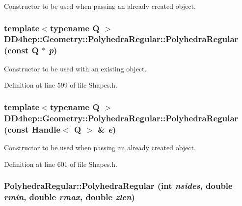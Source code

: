 Constructor to be used when passing an already created object. \hypertarget{class_d_d4hep_1_1_geometry_1_1_polyhedra_regular_afa1b9c6651dddf2914285ea518952483}{
\subsubsection[{PolyhedraRegular}]{\setlength{\rightskip}{0pt plus 5cm}template$<$typename Q $>$ DD4hep::Geometry::PolyhedraRegular::PolyhedraRegular (const Q $\ast$ {\em p})}}
\label{class_d_d4hep_1_1_geometry_1_1_polyhedra_regular_afa1b9c6651dddf2914285ea518952483}


Constructor to be used with an existing object. 

Definition at line 599 of file Shapes.h.\hypertarget{class_d_d4hep_1_1_geometry_1_1_polyhedra_regular_a41de4e7386705efc5b22529f2f4c2de5}{
\subsubsection[{PolyhedraRegular}]{\setlength{\rightskip}{0pt plus 5cm}template$<$typename Q $>$ DD4hep::Geometry::PolyhedraRegular::PolyhedraRegular (const {\bf Handle}$<$ Q $>$ \& {\em e})}}
\label{class_d_d4hep_1_1_geometry_1_1_polyhedra_regular_a41de4e7386705efc5b22529f2f4c2de5}


Constructor to be used when passing an already created object. 

Definition at line 601 of file Shapes.h.\hypertarget{class_d_d4hep_1_1_geometry_1_1_polyhedra_regular_a81603bb686b56fd58fd78942907c1fb6}{
\subsubsection[{PolyhedraRegular}]{\setlength{\rightskip}{0pt plus 5cm}PolyhedraRegular::PolyhedraRegular (int {\em nsides}, \/  double {\em rmin}, \/  double {\em rmax}, \/  double {\em zlen})}}
\label{class_d_d4hep_1_1_geometry_1_1_polyhedra_regular_a81603bb686b56fd58fd78942907c1fb6}


